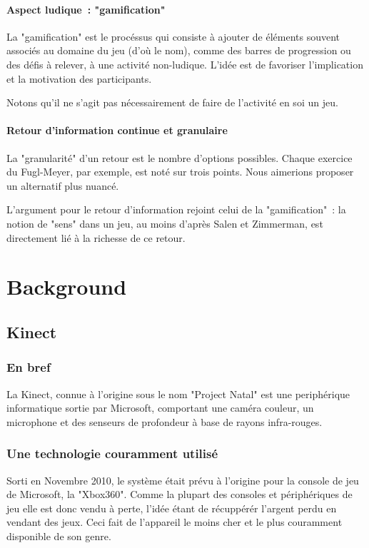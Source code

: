 \documentclass{report}
\begin{document}
		\subsubsection{Aspect ludique~: "gamification"}
		La "gamification" est le procéssus qui consiste à ajouter de éléments 
		souvent associés au domaine du jeu (d'où le nom), comme des barres de
		progression ou des défis à relever, à une activité non-ludique. L'idée est 
		de favoriser l'implication et la motivation des participants. 
		
		Notons qu'il ne s'agit pas nécessairement de faire de l'activité en soi un 
		jeu.
		
		
    \subsubsection{Retour d'information continue et granulaire}
    La "granularité" d'un retour est le nombre d'options possibles. 
    Chaque exercice du Fugl-Meyer, par exemple, est noté sur trois points. Nous 
    aimerions proposer un alternatif plus nuancé.
    
    L'argument pour le retour d'information rejoint celui de la "gamification"~:
    la notion de "sens" dans un jeu, au moins d'après Salen et Zimmerman, est 
    directement lié à la richesse de ce retour.
    

		
	\chapter{Background}
		\section{Kinect} 
		
		\subsection{En bref}
		La Kinect, connue à l'origine sous le nom "Project Natal" est une 
		periphérique informatique sortie par Microsoft, comportant une caméra 
		couleur, un microphone et des senseurs de profondeur à base de rayons 
		infra-rouges.
		
		\subsection{Une technologie couramment utilisé}
		Sorti en Novembre 2010, le système était prévu à l'origine pour la console 
		de jeu de Microsoft, la "Xbox360". Comme la plupart des consoles et 
		périphériques de jeu elle 
		est donc vendu à perte, l'idée étant de récuppérér l'argent perdu en vendant 
		des jeux. Ceci fait de l'appareil le moins cher et le plus couramment 
		disponible de son genre.
		
\end{document}
